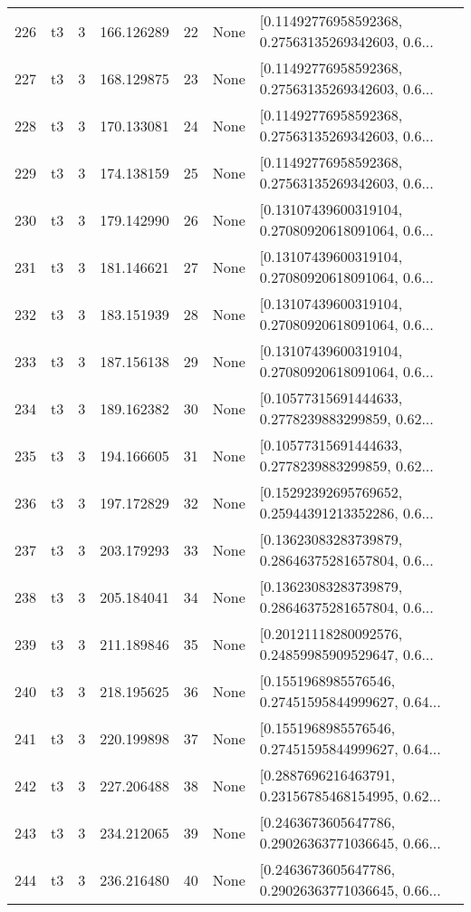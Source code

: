 \begin{tabular}{lllrlll}
226 &  t3 &   3 &  166.126289 &   22 &  None &  [0.11492776958592368, 0.27563135269342603, 0.6... \\
227 &  t3 &   3 &  168.129875 &   23 &  None &  [0.11492776958592368, 0.27563135269342603, 0.6... \\
228 &  t3 &   3 &  170.133081 &   24 &  None &  [0.11492776958592368, 0.27563135269342603, 0.6... \\
229 &  t3 &   3 &  174.138159 &   25 &  None &  [0.11492776958592368, 0.27563135269342603, 0.6... \\
230 &  t3 &   3 &  179.142990 &   26 &  None &  [0.13107439600319104, 0.27080920618091064, 0.6... \\
231 &  t3 &   3 &  181.146621 &   27 &  None &  [0.13107439600319104, 0.27080920618091064, 0.6... \\
232 &  t3 &   3 &  183.151939 &   28 &  None &  [0.13107439600319104, 0.27080920618091064, 0.6... \\
233 &  t3 &   3 &  187.156138 &   29 &  None &  [0.13107439600319104, 0.27080920618091064, 0.6... \\
234 &  t3 &   3 &  189.162382 &   30 &  None &  [0.10577315691444633, 0.2778239883299859, 0.62... \\
235 &  t3 &   3 &  194.166605 &   31 &  None &  [0.10577315691444633, 0.2778239883299859, 0.62... \\
236 &  t3 &   3 &  197.172829 &   32 &  None &  [0.15292392695769652, 0.25944391213352286, 0.6... \\
237 &  t3 &   3 &  203.179293 &   33 &  None &  [0.13623083283739879, 0.28646375281657804, 0.6... \\
238 &  t3 &   3 &  205.184041 &   34 &  None &  [0.13623083283739879, 0.28646375281657804, 0.6... \\
239 &  t3 &   3 &  211.189846 &   35 &  None &  [0.20121118280092576, 0.24859985909529647, 0.6... \\
240 &  t3 &   3 &  218.195625 &   36 &  None &  [0.1551968985576546, 0.27451595844999627, 0.64... \\
241 &  t3 &   3 &  220.199898 &   37 &  None &  [0.1551968985576546, 0.27451595844999627, 0.64... \\
242 &  t3 &   3 &  227.206488 &   38 &  None &  [0.2887696216463791, 0.23156785468154995, 0.62... \\
243 &  t3 &   3 &  234.212065 &   39 &  None &  [0.2463673605647786, 0.29026363771036645, 0.66... \\
244 &  t3 &   3 &  236.216480 &   40 &  None &  [0.2463673605647786, 0.29026363771036645, 0.66... \\

\end{tabular}
